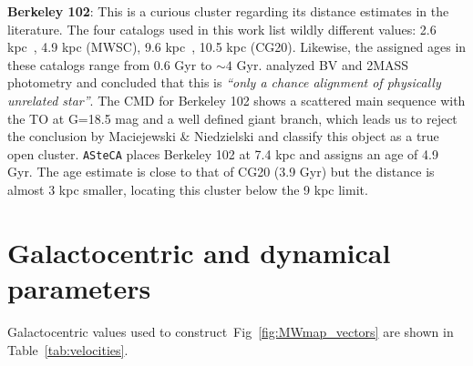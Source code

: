 \documentclass{aa}
\begin{document}
\begin{appendix}
  \noindent \textbf{Berkeley 102}: This is a curious cluster regarding its distance
  estimates in the literature. The four catalogs used in this work list wildly
  different values: 2.6 kpc~\citep[WEBDA;][]{Tadross_2008}, 4.9 kpc (MWSC),
  9.6 kpc~\citep[OC02;][]{Hasegawa_2008}, 10.5 kpc (CG20). Likewise, the
  assigned ages in these catalogs range from 0.6 Gyr to $\sim4$ Gyr.
  \cite{Maciejewski_2008} analyzed BV and 2MASS photometry and concluded that
  this is \emph{``only a chance alignment of physically unrelated star''}.
  The CMD for Berkeley 102 shows a scattered main sequence with the TO at G=18.5
  mag and a well defined giant branch, which leads us to reject the conclusion
  by Maciejewski \& Niedzielski and classify this object as a true open cluster.
  \texttt{ASteCA} places Berkeley 102 at 7.4 kpc and assigns an age of 4.9 Gyr.
  The age estimate is close to that of CG20 (3.9 Gyr) but the distance is
  almost 3 kpc smaller, locating this cluster below the 9 kpc limit.\\


\FloatBarrier
\section{Galactocentric and dynamical parameters}
  \label{app:galac_dynam}

  Galactocentric values used to construct~Fig~\ref{fig:MWmap_vectors} are shown
  in Table~\ref{tab:velocities}.


\end{appendix}
\end{document}
